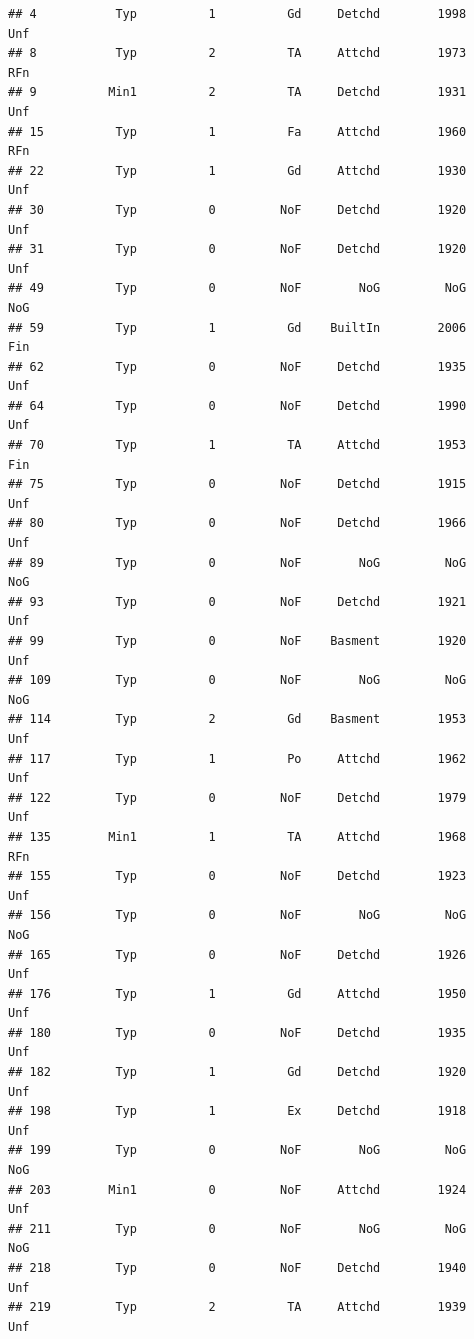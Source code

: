 \documentclass[]{article}
\begin{document}
\begin{verbatim}
## 4           Typ          1          Gd     Detchd        1998          Unf
## 8           Typ          2          TA     Attchd        1973          RFn
## 9          Min1          2          TA     Detchd        1931          Unf
## 15          Typ          1          Fa     Attchd        1960          RFn
## 22          Typ          1          Gd     Attchd        1930          Unf
## 30          Typ          0         NoF     Detchd        1920          Unf
## 31          Typ          0         NoF     Detchd        1920          Unf
## 49          Typ          0         NoF        NoG         NoG          NoG
## 59          Typ          1          Gd    BuiltIn        2006          Fin
## 62          Typ          0         NoF     Detchd        1935          Unf
## 64          Typ          0         NoF     Detchd        1990          Unf
## 70          Typ          1          TA     Attchd        1953          Fin
## 75          Typ          0         NoF     Detchd        1915          Unf
## 80          Typ          0         NoF     Detchd        1966          Unf
## 89          Typ          0         NoF        NoG         NoG          NoG
## 93          Typ          0         NoF     Detchd        1921          Unf
## 99          Typ          0         NoF    Basment        1920          Unf
## 109         Typ          0         NoF        NoG         NoG          NoG
## 114         Typ          2          Gd    Basment        1953          Unf
## 117         Typ          1          Po     Attchd        1962          Unf
## 122         Typ          0         NoF     Detchd        1979          Unf
## 135        Min1          1          TA     Attchd        1968          RFn
## 155         Typ          0         NoF     Detchd        1923          Unf
## 156         Typ          0         NoF        NoG         NoG          NoG
## 165         Typ          0         NoF     Detchd        1926          Unf
## 176         Typ          1          Gd     Attchd        1950          Unf
## 180         Typ          0         NoF     Detchd        1935          Unf
## 182         Typ          1          Gd     Detchd        1920          Unf
## 198         Typ          1          Ex     Detchd        1918          Unf
## 199         Typ          0         NoF        NoG         NoG          NoG
## 203        Min1          0         NoF     Attchd        1924          Unf
## 211         Typ          0         NoF        NoG         NoG          NoG
## 218         Typ          0         NoF     Detchd        1940          Unf
## 219         Typ          2          TA     Attchd        1939          Unf

\end{verbatim}
\end{document}
